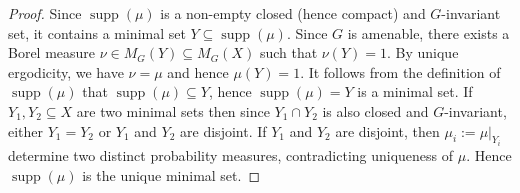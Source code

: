\documentclass[10pt,a4paper]{amsart}
\DeclareMathOperator{\supp}{supp}
\begin{document}
\begin{proof}
     Since $\supp(\mu)$ is a non-empty closed (hence compact) and $G$-invariant set, it contains a minimal set $Y\subseteq \supp(\mu)$. Since $G$ is amenable, there exists a Borel measure $\nu \in M_G(Y)\subseteq M_G(X)$ such that $\nu(Y) = 1$. By unique ergodicity, we have $\nu = \mu$ and hence $\mu(Y) = 1$. It follows from the definition of $\supp(\mu)$ that $\supp(\mu)\subseteq Y$, hence $\supp(\mu) = Y$ is a minimal set. If $Y_1,Y_2\subseteq X$ are two minimal sets then since $Y_1\cap Y_2$ is also closed and $G$-invariant, either $Y_1 = Y_2$ or $Y_1$ and $Y_2$ are disjoint. If $Y_1$ and $Y_2$ are disjoint, then $\mu_i := \mu|_{Y_i}$ determine two distinct probability measures, contradicting uniqueness of $\mu$. Hence $\supp(\mu)$ is the unique minimal set. 
\end{proof}
\end{document}

